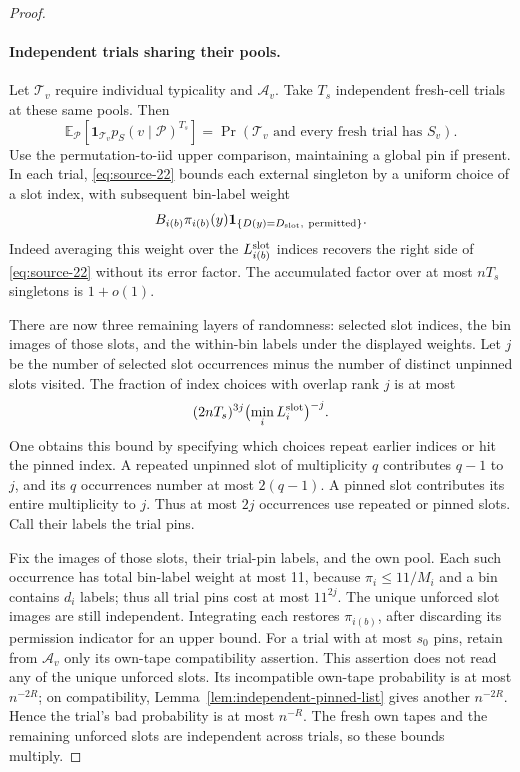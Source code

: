 \begin{proof}
\paragraph{Independent trials sharing their pools.}
Let \(\mathcal T_v\) require individual typicality and \(\mathcal A_v\).
Take \(T_s\) independent fresh-cell trials at these same pools. Then
\[
 \mathbb E_{\mathcal P}
       [\mathbf1_{\mathcal T_v}p_S(v\mid\mathcal P)^{T_s}]
 =\Pr(\mathcal T_v\text{ and every fresh trial has }S_v).
\]
Use the permutation-to-iid upper comparison, maintaining a global pin if
present. In each trial, \eqref{eq:source-22} bounds each external
singleton by a uniform choice of a slot index, with subsequent bin-label
weight
\[
 B_{i(b)}\pi_{i(b)}(y)
       \mathbf1_{\{D(y)=D_{\rm slot},\ {\rm permitted}\}}.
\]
Indeed averaging this weight over the \(L_{i(b)}^{\rm slot}\) indices
recovers the right side of \eqref{eq:source-22} without its error factor.
The accumulated factor over at most \(nT_s\) singletons is \(1+o(1)\).

There are now three remaining layers of randomness: selected slot indices,
the bin images of those slots, and the within-bin labels under the displayed
weights. Let \(j\) be the number of selected slot occurrences minus the
number of distinct unpinned slots visited. The fraction of index choices
with overlap rank \(j\) is at most
\[
 (2nT_s)^{3j}\bigl(\min_i L_i^{\rm slot}\bigr)^{-j}.
\]
One obtains this bound by specifying which choices repeat earlier indices
or hit the pinned index. A repeated unpinned slot of multiplicity \(q\)
contributes \(q-1\) to \(j\), and its \(q\) occurrences number at most
\(2(q-1)\). A pinned slot contributes its entire multiplicity to \(j\).
Thus at most \(2j\) occurrences use repeated or pinned slots. Call their
labels the trial pins.

Fix the images of those slots, their trial-pin labels, and the own pool.
Each such occurrence has total bin-label weight at most 11, because
\(\pi_i\le11/M_i\) and a bin contains \(d_i\) labels; thus all trial
pins cost at most \(11^{2j}\). The unique unforced slot images are still
independent. Integrating each restores \(\pi_{i(b)}\), after discarding
its permission indicator for an upper bound. For a trial with at most
\(s_0\) pins, retain from \(\mathcal A_v\) only its own-tape
compatibility assertion. This assertion does not read any of the unique
unforced slots. Its incompatible own-tape probability is at most
\(n^{-2R}\); on compatibility, Lemma~\ref{lem:independent-pinned-list}
gives another \(n^{-2R}\). Hence the trial's bad probability is at most
\(n^{-R}\). The fresh own tapes and the remaining unforced slots are
independent across trials, so these bounds multiply.


\end{proof}
